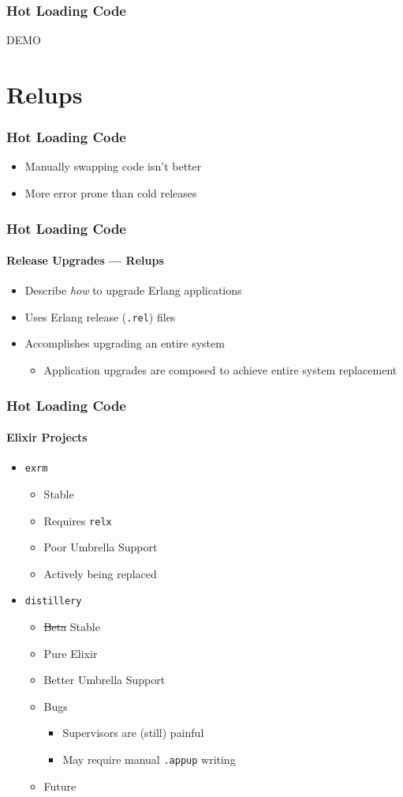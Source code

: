 \documentclass{beamer}
\begin{document}
\begin{frame}
\frametitle{Hot Loading Code}
\Huge{DEMO}
\end{frame}

\section{Relups}

\begin{frame}
\frametitle{Hot Loading Code}
\begin{itemize}
\item{Manually swapping code isn't better}
\item{More error prone than cold releases}
\end{itemize}
\end{frame}

\begin{frame}
\frametitle{Hot Loading Code}
\framesubtitle{Release Upgrades --- Relups}
\begin{itemize}
\item{Describe \textit{how} to upgrade Erlang applications}
\item{Uses Erlang release (\texttt{.rel}) files}
\item{Accomplishes upgrading an entire system}
\begin{itemize}
\item{Application upgrades are composed to achieve entire system replacement}
\end{itemize}
\end{itemize}
\end{frame}

\begin{frame}
\frametitle{Hot Loading Code}
\framesubtitle{Elixir Projects}
\begin{itemize}
\item{\texttt{exrm}~\cite{website:bitwalker/exrm}}
\begin{itemize}
\item{Stable}
\item{Requires \texttt{relx}~\cite{website:erlware/relx}}
\item{Poor Umbrella Support}
\item{Actively being replaced}
\end{itemize}
\item{\texttt{distillery}~\cite{website:bitwalker/distillery}}
\begin{itemize}
\item{\sout{Beta} Stable}
\item{Pure Elixir}
\item{Better Umbrella Support}
\item{Bugs}
\begin{itemize}
\item{Supervisors are (still) painful}
\item{May require manual \texttt{.appup} writing}
\end{itemize}
\item{Future}
\end{itemize}
\end{itemize}
\end{frame}
\end{document}
